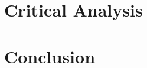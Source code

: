 \documentclass[notitlepage,12pt]{article}
\begin{document}


\section{Critical Analysis}

\section{Conclusion}

\clearpage


\end{document}

